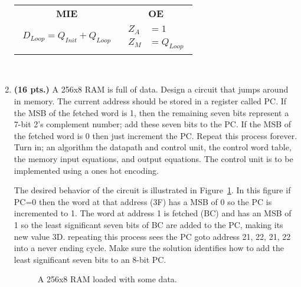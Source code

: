 \begin{enumerate}
\begin{onlysolution}[fragile]
            \begin{tabular}{cc}
                \textbf{MIE}                   & \textbf{OE} \\
                {$
                    \begin{aligned}
                        D_{Loop} = Q_{Init} + Q_{Loop}
                \end{aligned}$} &
                {$
                    \begin{aligned}
                        Z_A & = 1        \\
                        Z_M & = Q_{Loop}
                \end{aligned}$}
            \end{tabular}\\
        \end{onlysolution}
    \item \textbf{ (16 pts.)}
        A 256x8 RAM is full of data.  Design a circuit that jumps
        around in memory.   The current address should be stored in a
        register called PC.  If the MSB of the fetched word is 1, then the
        remaining seven bits represent a 7-bit 2's complement number;  add these
        seven bits to the PC.  If the MSB of the fetched word is 0 then just
        increment the PC.  Repeat this process forever.
        Turn in; an algorithm the datapath and control unit, the control word
        table, the memory input equations, and output equations.
        The control unit is to be implemented using a ones hot encoding.

        The desired behavior of the circuit is illustrated in
        Figure~\ref{fig:RAMhopper2}.  In this figure if PC=0 then the word at
        that address (3F) has a MSB of 0 so the PC is incremented to 1. The
        word at address 1 is fetched (BC) and has an MSB of 1 so the least
        significant seven bits of BC are added to the PC, making its new value
        3D.  repeating this process sees the PC goto address 21, 22, 21, 22
        into a never ending cycle.   Make sure the solution identifies how
        to add the least significant seven bits to an 8-bit PC.

        \begin{figure}[ht]
            \caption{A 256x8 RAM loaded with some data.}
            \label{fig:RAMhopper2}
        \end{figure}


\end{enumerate}
